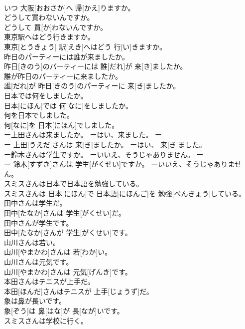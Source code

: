 \documentclass[8pt]{extreport}
\begin{document}
\begin{CJK}{UTF8}{min}
\\	いつ 大阪[おおさか]へ 帰[かえ]りますか。
\\	どうして買わないんですか。	
\\	どうして 買[か]わないんですか。
\\	東京駅へはどう行きますか。	
\\	東京[とうきょう] 駅[えき]へはどう 行[い]きますか。
\\	昨日のパーティーには誰が来ましたか。	
\\	昨日[きのう]のパーティーには 誰[だれ]が 来[き]ましたか。
\\	誰が昨日のパーティーに来ましたか。	
\\	誰[だれ]が 昨日[きのう]のパーティーに 来[き]ましたか。
\\	日本では何をしましたか。	
\\	日本[にほん]では 何[なに]をしましたか。
\\	何を日本でしました。	
\\	何[なに]を 日本[にほん]でしました。
\\	ー上田さんは来ましたか。 ーはい、来ました。	ー
\\	ー 上田[うえだ]さんは 来[き]ましたか。 ーはい、 来[き]ました。
\\	ー鈴木さんは学生ですか。 ーいいえ、そうじゃありません。	ー
\\	ー 鈴木[すずき]さんは 学生[がくせい]ですか。 ーいいえ、そうじゃありません。
\\	スミスさんは日本で日本語を勉強している。	
\\	スミスさんは 日本[にほん]で 日本語[にほんご]を 勉強[べんきょう]している。
\\	田中さんは学生だ。	
\\	田中[たなか]さんは 学生[がくせい]だ。
\\	田中さんが学生です。	
\\	田中[たなか]さんが 学生[がくせい]です。
\\	山川さんは若い。	
\\	山川[やまかわ]さんは 若[わか]い。
\\	山川さんは元気です。	
\\	山川[やまかわ]さんは 元気[げんき]です。
\\	本田さんはテニスが上手だ。	
\\	本田[ほんだ]さんはテニスが 上手[じょうず]だ。
\\	象は鼻が長いです。	
\\	象[ぞう]は 鼻[はな]が 長[なが]いです。
\\	スミスさんは学校に行く。	

\end{CJK}
\end{document}
